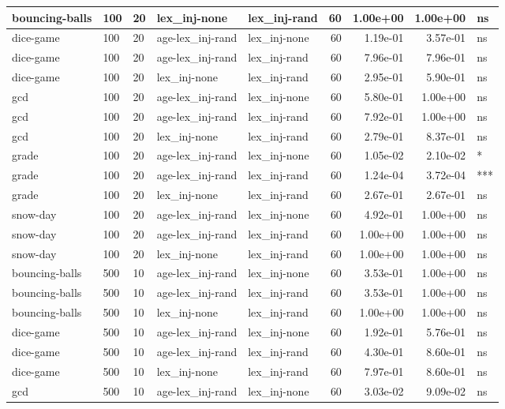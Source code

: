 \documentclass[
]{book}
\begin{document}
\begin{table}
\begin{tabular}[t]{l|l|l|l|l|r|r|r|l}
bouncing-balls & 100 & 20 & lex\_inj-none & lex\_inj-rand & 60 & 1.00e+00 & 1.00e+00 & ns\\
\hline
dice-game & 100 & 20 & age-lex\_inj-rand & lex\_inj-none & 60 & 1.19e-01 & 3.57e-01 & ns\\
\hline
dice-game & 100 & 20 & age-lex\_inj-rand & lex\_inj-rand & 60 & 7.96e-01 & 7.96e-01 & ns\\
\hline
dice-game & 100 & 20 & lex\_inj-none & lex\_inj-rand & 60 & 2.95e-01 & 5.90e-01 & ns\\
\hline
gcd & 100 & 20 & age-lex\_inj-rand & lex\_inj-none & 60 & 5.80e-01 & 1.00e+00 & ns\\
\hline
gcd & 100 & 20 & age-lex\_inj-rand & lex\_inj-rand & 60 & 7.92e-01 & 1.00e+00 & ns\\
\hline
gcd & 100 & 20 & lex\_inj-none & lex\_inj-rand & 60 & 2.79e-01 & 8.37e-01 & ns\\
\hline
grade & 100 & 20 & age-lex\_inj-rand & lex\_inj-none & 60 & 1.05e-02 & 2.10e-02 & *\\
\hline
grade & 100 & 20 & age-lex\_inj-rand & lex\_inj-rand & 60 & 1.24e-04 & 3.72e-04 & ***\\
\hline
grade & 100 & 20 & lex\_inj-none & lex\_inj-rand & 60 & 2.67e-01 & 2.67e-01 & ns\\
\hline
snow-day & 100 & 20 & age-lex\_inj-rand & lex\_inj-none & 60 & 4.92e-01 & 1.00e+00 & ns\\
\hline
snow-day & 100 & 20 & age-lex\_inj-rand & lex\_inj-rand & 60 & 1.00e+00 & 1.00e+00 & ns\\
\hline
snow-day & 100 & 20 & lex\_inj-none & lex\_inj-rand & 60 & 1.00e+00 & 1.00e+00 & ns\\
\hline
bouncing-balls & 500 & 10 & age-lex\_inj-rand & lex\_inj-none & 60 & 3.53e-01 & 1.00e+00 & ns\\
\hline
bouncing-balls & 500 & 10 & age-lex\_inj-rand & lex\_inj-rand & 60 & 3.53e-01 & 1.00e+00 & ns\\
\hline
bouncing-balls & 500 & 10 & lex\_inj-none & lex\_inj-rand & 60 & 1.00e+00 & 1.00e+00 & ns\\
\hline
dice-game & 500 & 10 & age-lex\_inj-rand & lex\_inj-none & 60 & 1.92e-01 & 5.76e-01 & ns\\
\hline
dice-game & 500 & 10 & age-lex\_inj-rand & lex\_inj-rand & 60 & 4.30e-01 & 8.60e-01 & ns\\
\hline
dice-game & 500 & 10 & lex\_inj-none & lex\_inj-rand & 60 & 7.97e-01 & 8.60e-01 & ns\\
\hline
gcd & 500 & 10 & age-lex\_inj-rand & lex\_inj-none & 60 & 3.03e-02 & 9.09e-02 & ns\\

\end{tabular}
\end{table}
\end{document}
